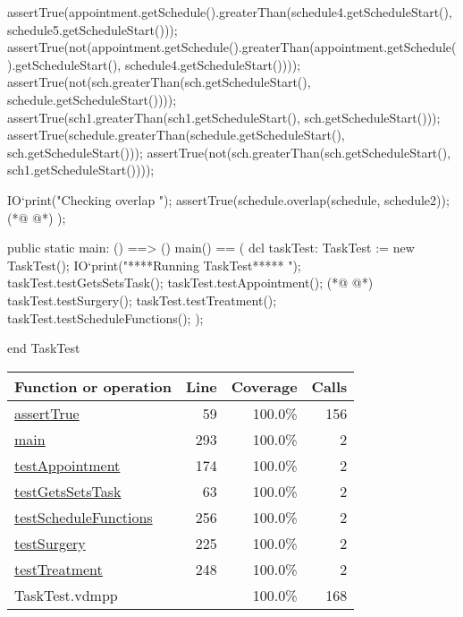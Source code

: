 \begin{vdmpp}[breaklines=true]
   assertTrue(appointment.getSchedule().greaterThan(schedule4.getScheduleStart(), schedule5.getScheduleStart()));
   assertTrue(not(appointment.getSchedule().greaterThan(appointment.getSchedule().getScheduleStart(), schedule4.getScheduleStart())));
   assertTrue(not(sch.greaterThan(sch.getScheduleStart(), schedule.getScheduleStart())));
   assertTrue(sch1.greaterThan(sch1.getScheduleStart(), sch.getScheduleStart()));
   assertTrue(schedule.greaterThan(schedule.getScheduleStart(), sch.getScheduleStart()));
   assertTrue(not(sch.greaterThan(sch.getScheduleStart(), sch1.getScheduleStart())));
   
   IO`print("\n Checking overlap \n");
   assertTrue(schedule.overlap(schedule, schedule2));
(*@
\label{testTreatment:248}
@*)
  );
  
  public static main: () ==> ()
   main() == (
    dcl taskTest: TaskTest := new TaskTest();
    IO`print("\n\n *****Running TaskTest***** \n");
    taskTest.testGetsSetsTask();
    taskTest.testAppointment();
(*@
\label{testScheduleFunctions:256}
@*)
    taskTest.testSurgery();
    taskTest.testTreatment();
    taskTest.testScheduleFunctions();
   );

end TaskTest
\end{vdmpp}
\bigskip
\begin{longtable}{|l|r|r|r|}
\hline
Function or operation & Line & Coverage & Calls \\
\hline
\hline
\hyperref[assertTrue:59]{assertTrue} & 59&100.0\% & 156 \\
\hline
\hyperref[main:293]{main} & 293&100.0\% & 2 \\
\hline
\hyperref[testAppointment:174]{testAppointment} & 174&100.0\% & 2 \\
\hline
\hyperref[testGetsSetsTask:63]{testGetsSetsTask} & 63&100.0\% & 2 \\
\hline
\hyperref[testScheduleFunctions:256]{testScheduleFunctions} & 256&100.0\% & 2 \\
\hline
\hyperref[testSurgery:225]{testSurgery} & 225&100.0\% & 2 \\
\hline
\hyperref[testTreatment:248]{testTreatment} & 248&100.0\% & 2 \\
\hline
\hline
TaskTest.vdmpp & & 100.0\% & 168 \\
\hline
\end{longtable}

